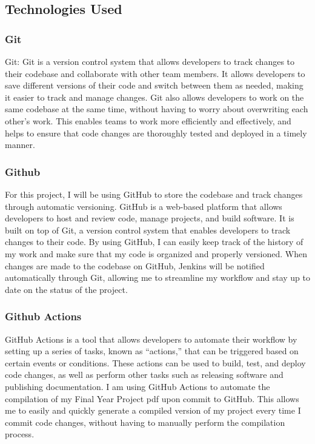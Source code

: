 \documentclass[
  10pt,
  paper=a4,
  ,captions=tableheading
]{scrartcl}
\begin{document}
\hypertarget{technologies-used}{%
\subsection{Technologies Used}\label{technologies-used}}

\hypertarget{git}{%
\subsubsection{Git}\label{git}}

Git: Git is a version control system that allows developers to track
changes to their codebase and collaborate with other team members. It
allows developers to save different versions of their code and switch
between them as needed, making it easier to track and manage changes.
Git also allows developers to work on the same codebase at the same
time, without having to worry about overwriting each other's work. This
enables teams to work more efficiently and effectively, and helps to
ensure that code changes are thoroughly tested and deployed in a timely
manner.

\hypertarget{github}{%
\subsubsection{Github}\label{github}}

For this project, I will be using GitHub to store the codebase and track
changes through automatic versioning. GitHub is a web-based platform
that allows developers to host and review code, manage projects, and
build software. It is built on top of Git, a version control system that
enables developers to track changes to their code. By using GitHub, I
can easily keep track of the history of my work and make sure that my
code is organized and properly versioned. When changes are made to the
codebase on GitHub, Jenkins will be notified automatically through Git,
allowing me to streamline my workflow and stay up to date on the status
of the project.

\hypertarget{github-actions}{%
\subsubsection{Github Actions}\label{github-actions}}

GitHub Actions is a tool that allows developers to automate their
workflow by setting up a series of tasks, known as ``actions,'' that can
be triggered based on certain events or conditions. These actions can be
used to build, test, and deploy code changes, as well as perform other
tasks such as releasing software and publishing documentation. I am
using GitHub Actions to automate the compilation of my Final Year
Project pdf upon commit to GitHub. This allows me to easily and quickly
generate a compiled version of my project every time I commit code
changes, without having to manually perform the compilation process.
\end{document}
